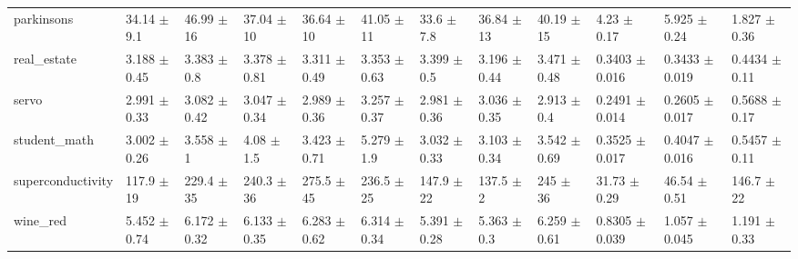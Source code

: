 \begin{tabular}{llllllllllll}
parkinsons & 34.14 $\pm$ 9.1 & 46.99 $\pm$ 16 & 37.04 $\pm$ 10 & 36.64 $\pm$ 10 & 41.05 $\pm$ 11 & 33.6 $\pm$ 7.8 & 36.84 $\pm$ 13 & 40.19 $\pm$ 15 & 4.23 $\pm$ 0.17 & 5.925 $\pm$ 0.24 & 1.827 $\pm$ 0.36 \\
real\_estate & 3.188 $\pm$ 0.45 & 3.383 $\pm$ 0.8 & 3.378 $\pm$ 0.81 & 3.311 $\pm$ 0.49 & 3.353 $\pm$ 0.63 & 3.399 $\pm$ 0.5 & 3.196 $\pm$ 0.44 & 3.471 $\pm$ 0.48 & 0.3403 $\pm$ 0.016 & 0.3433 $\pm$ 0.019 & 0.4434 $\pm$ 0.11 \\
servo & 2.991 $\pm$ 0.33 & 3.082 $\pm$ 0.42 & 3.047 $\pm$ 0.34 & 2.989 $\pm$ 0.36 & 3.257 $\pm$ 0.37 & 2.981 $\pm$ 0.36 & 3.036 $\pm$ 0.35 & 2.913 $\pm$ 0.4 & 0.2491 $\pm$ 0.014 & 0.2605 $\pm$ 0.017 & 0.5688 $\pm$ 0.17 \\
student\_math & 3.002 $\pm$ 0.26 & 3.558 $\pm$ 1 & 4.08 $\pm$ 1.5 & 3.423 $\pm$ 0.71 & 5.279 $\pm$ 1.9 & 3.032 $\pm$ 0.33 & 3.103 $\pm$ 0.34 & 3.542 $\pm$ 0.69 & 0.3525 $\pm$ 0.017 & 0.4047 $\pm$ 0.016 & 0.5457 $\pm$ 0.11 \\
superconductivity & 117.9 $\pm$ 19 & 229.4 $\pm$ 35 & 240.3 $\pm$ 36 & 275.5 $\pm$ 45 & 236.5 $\pm$ 25 & 147.9 $\pm$ 22 & 137.5 $\pm$ 2 & 245 $\pm$ 36 & 31.73 $\pm$ 0.29 & 46.54 $\pm$ 0.51 & 146.7 $\pm$ 22 \\
wine\_red & 5.452 $\pm$ 0.74 & 6.172 $\pm$ 0.32 & 6.133 $\pm$ 0.35 & 6.283 $\pm$ 0.62 & 6.314 $\pm$ 0.34 & 5.391 $\pm$ 0.28 & 5.363 $\pm$ 0.3 & 6.259 $\pm$ 0.61 & 0.8305 $\pm$ 0.039 & 1.057 $\pm$ 0.045 & 1.191 $\pm$ 0.33 \\
\bottomrule
\end{tabular}
